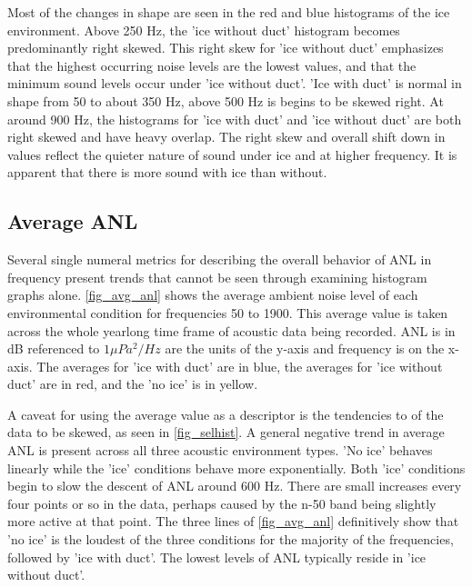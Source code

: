 Most of the changes in shape are seen in the red and blue histograms of the ice environment. Above 250 Hz, the 'ice without duct' histogram becomes predominantly right skewed. This right skew for 'ice without duct' emphasizes that the highest occurring noise levels are the lowest values, and that the minimum sound levels occur under 'ice without duct'.  'Ice with duct' is normal in shape from 50 to about 350 Hz, above 500 Hz is begins to be skewed right. At around 900 Hz, the histograms for 'ice with duct' and 'ice without duct' are both right skewed and have heavy overlap. The right skew and overall shift down in values reflect the quieter nature of sound under ice and at higher frequency. It is apparent that there is more sound with ice than without.




\subsection{Average ANL} \label{sec_avg_anl}
Several single numeral metrics for describing the overall behavior of ANL in frequency present trends that cannot be seen through examining histogram graphs alone. \autoref{fig_avg_anl} shows the average ambient noise level of each environmental condition for frequencies 50 to 1900. This average value is taken across the whole yearlong time frame of acoustic data being recorded.  ANL is in dB referenced to $ 1 \mu Pa^{2}/Hz$ are the units of the y-axis and frequency is on the x-axis. The averages for 'ice with duct' are in blue, the averages for 'ice without duct' are in red, and the 'no ice' is in yellow.

A caveat for using the average value as a descriptor is the tendencies to of the data to be skewed, as seen in \autoref{fig_selhist}. A general negative trend in average ANL is present across all three acoustic environment types. 'No ice' behaves linearly while the 'ice' conditions behave more exponentially. Both 'ice' conditions begin to slow the descent of ANL around 600 Hz. There are small increases every four points or so in the data, perhaps caused by the n-50 band being slightly more active at that point. The three lines of \autoref{fig_avg_anl} definitively show that 'no ice' is the loudest of the three conditions for the majority of the frequencies, followed by 'ice with duct'. The lowest levels of ANL typically reside in 'ice without duct'.

